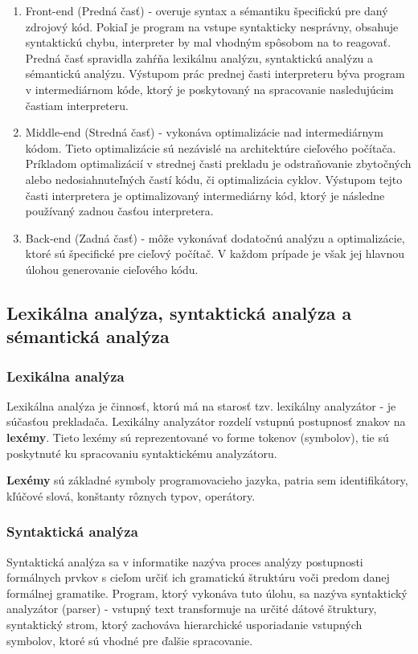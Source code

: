 \begin{enumerate}
	\item Front-end (Predná časť) - overuje syntax a sémantiku špecifickú pre daný zdrojový kód. 
	Pokiaľ je program na vstupe syntakticky nesprávny, obsahuje syntaktickú chybu, 
	interpreter by mal vhodným spôsobom na to reagovať. 
	Predná časť spravidla zahŕňa lexikálnu analýzu, syntaktickú analýzu a sémantickú analýzu.
	Výstupom prác prednej časti interpreteru býva program v intermediárnom kóde, 
	ktorý je poskytovaný na spracovanie nasledujúcim častiam interpreteru.

	\item Middle-end (Stredná časť) - vykonáva optimalizácie nad intermediárnym kódom. 
	Tieto optimalizácie sú nezávislé na architektúre cieľového počítača. 
	Príkladom optimalizácií v strednej časti prekladu je odstraňovanie zbytočných 
	alebo nedosiahnuteľných častí kódu, či optimalizácia cyklov. Výstupom tejto časti interpretera 
	je optimalizovaný intermediárny kód, ktorý je následne používaný zadnou časťou interpretera.

	\item Back-end (Zadná časť) -  môže vykonávať dodatočnú analýzu a optimalizácie, 
	ktoré sú špecifické pre cieľový počítač. V každom prípade je však jej hlavnou úlohou 
	generovanie cieľového kódu.
\end{enumerate}

\subsection{Lexikálna analýza, syntaktická analýza a sémantická analýza}

\subsubsection{Lexikálna analýza}
Lexikálna analýza je činnosť, ktorú má na starosť tzv. lexikálny analyzátor - 
je súčasťou prekladača. Lexikálny analyzátor rozdelí vstupnú postupnosť znakov na \textbf{lexémy}. 
Tieto lexémy sú reprezentované vo forme tokenov (symbolov), tie sú poskytnuté 
ku spracovaniu syntaktickému analyzátoru.

\textbf{Lexémy} sú základné symboly programovacieho jazyka, patria sem identifikátory,
kľúčové slová, konštanty rôznych typov, operátory.

\subsubsection{Syntaktická analýza}
Syntaktická analýza sa v informatike nazýva proces analýzy postupnosti 
formálnych prvkov s cieľom určiť ich gramatickú štruktúru voči predom danej formálnej gramatike.
Program, ktorý vykonáva tuto úlohu, sa nazýva syntaktický analyzátor (parser) - 
vstupný text transformuje na určité dátové štruktury, syntaktický strom, 
ktorý zachováva hierarchické usporiadanie vstupných symbolov, ktoré sú vhodné pre ďalšie spracovanie.

